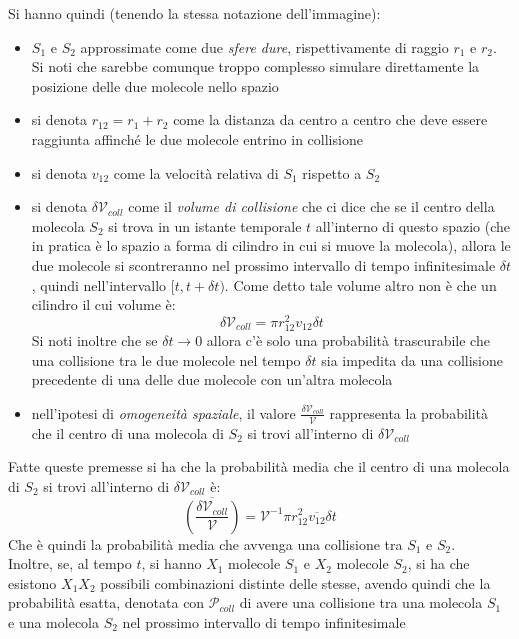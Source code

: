 \documentclass[a4paper,12pt, oneside]{book}
\begin{document}
Si hanno quindi (tenendo la stessa notazione dell'immagine):
\begin{itemize}
  \item $S_1$ e $S_2$ approssimate come due \textit{sfere dure}, rispettivamente
  di raggio $r_1$ e $r_2$. Si noti che sarebbe comunque troppo complesso
  simulare direttamente la posizione delle due molecole nello spazio
  \item si denota $r_{12}=r_1+r_2$ come la distanza da centro a centro
  che deve essere raggiunta affinché le due molecole entrino in collisione 
  \item si denota $v_{12}$ come la velocità relativa di $S_1$ rispetto a $S_2$
  \item si denota $\delta \mathcal{V}_{coll}$ come il \textit{volume di
    collisione} che ci dice che se il centro della molecola $S_2$ si trova in un
  istante temporale $t$ all'interno di questo spazio (che in pratica è lo spazio
  a forma di cilindro in cui si muove la molecola), allora le due molecole
  si scontreranno nel prossimo intervallo di tempo infinitesimale $\delta t$,
  quindi nell'intervallo $[t, t+\delta t)$. Come detto tale volume altro non è
  che un cilindro il cui volume è:
  \[\delta\mathcal{V}_{coll}=\pi r_{12}^2v_{12}\delta t\]
  Si noti inoltre che se $\delta t\to 0$ allora c'è solo una probabilità
  trascurabile che una collisione tra le due molecole nel tempo $\delta t$ sia
  impedita da una collisione precedente di una delle due molecole con un'altra
  molecola 
  \item nell'ipotesi di \textit{omogeneità spaziale}, il valore
  $\frac{\delta\mathcal{V}_{coll}}{\mathcal{V}}$  rappresenta la
  probabilità che il centro di una molecola di $S_2$ si trovi all'interno di
  $\delta\mathcal{V}_{coll}$  
\end{itemize}
Fatte queste premesse si ha che la probabilità media che il centro di una
molecola di $S_2$ si trovi all'interno di $\delta\mathcal{V}_{coll}$ è:
\[\overline{\left(\frac{\delta\mathcal{V}_{coll}}{\mathcal{V}}\right)}=
  \mathcal{V}^{-1}\pi r_{12}^2\overline{v_{12}}\delta t\]
Che è quindi la probabilità media che avvenga una collisione tra $S_1$ e
$S_2$. \\
Inoltre, se, al tempo $t$, si hanno $X_1$ molecole $S_1$ e $X_2$ molecole $S_2$,
si ha che esistono $X_1X_2$ possibili combinazioni distinte delle stesse, avendo
quindi che la probabilità esatta, denotata con $\mathcal{P}_{coll}$ di avere una
collisione tra una molecola $S_1$ e 
una molecola $S_2$ nel prossimo intervallo di tempo infinitesimale
\end{document}

